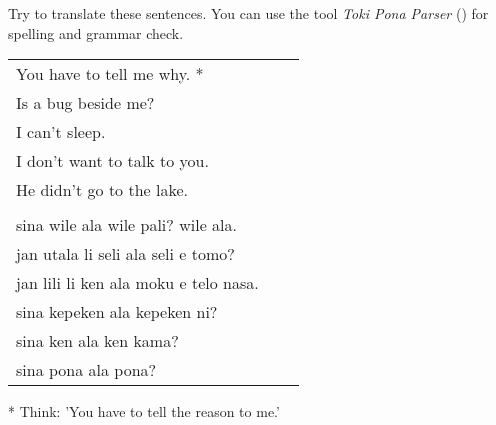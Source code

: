 Try to translate these sentences. 
You can use the tool \textit{Toki Pona Parser} (\cite{www:rowa:02}) for spelling and grammar check. 

\begin{supertabular}{p{5,5cm}|ll}
You have to tell me why. *  &&   \\ %
Is a bug beside me?  &&    \\ %
I can't sleep.  &&    \\ %
I don't want to talk to you.  &&    \\ %
He didn't go to the lake.   &&   \\ %
 && \\ %
sina wile ala wile pali? wile ala.  &&    \\ %
jan utala li seli ala seli e tomo?   &&   \\ %
jan lili li ken ala moku e telo nasa.   &&   \\ %
sina kepeken ala kepeken ni?  &&    \\ %
sina ken ala ken kama?   &&   \\ %
sina pona ala pona? &&   \\ %
\end{supertabular} 

* Think: 'You have to tell the reason to me.' 
